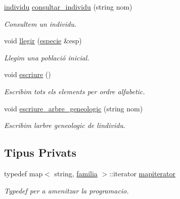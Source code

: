 \begin{DoxyCompactItemize}
\hyperlink{classindividu}{individu} \hyperlink{classpoblacio_a30ec7988306978a608ab11062069e6e1}{consultar\+\_\+individu} (string nom)
\begin{DoxyCompactList}\small\item\em Consultem un individu. \end{DoxyCompactList}\item 
void \hyperlink{classpoblacio_a02fda63e8b0144ce197764753778a201}{llegir} (\hyperlink{classespecie}{especie} \&esp)
\begin{DoxyCompactList}\small\item\em Llegim una població inicial. \end{DoxyCompactList}\item 
void \hyperlink{classpoblacio_aef82aca848d299bc5eff6d6b479a5081}{escriure} ()
\begin{DoxyCompactList}\small\item\em Escribim tots els elements per ordre alfabetic. \end{DoxyCompactList}\item 
void \hyperlink{classpoblacio_a30e1c829999a403012ce09172461d656}{escriure\+\_\+arbre\+\_\+geneologic} (string nom)
\begin{DoxyCompactList}\small\item\em Escribim l\textquotesingle{}arbre geneologic de l\textquotesingle{}individu. \end{DoxyCompactList}\end{DoxyCompactItemize}
\subsection*{Tipus Privats}
\begin{DoxyCompactItemize}
\item 
typedef map$<$ string, \hyperlink{structpoblacio_1_1familia}{familia} $>$\+::iterator \hyperlink{classpoblacio_a52c3d96b08f7679f27487e7499185ed1}{mapiterator}
\begin{DoxyCompactList}\small\item\em Typedef per a amenitzar la programacio. \end{DoxyCompactList}\end{DoxyCompactItemize}
